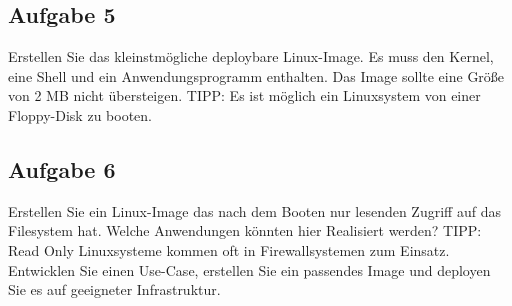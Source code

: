 \documentclass{article}
\begin{document}
    \subsection{Aufgabe 5}
    Erstellen Sie das kleinstmögliche deploybare Linux-Image. Es muss den Kernel, eine Shell und ein Anwendungsprogramm enthalten.
    Das Image sollte eine Größe von 2 MB nicht übersteigen. TIPP: Es ist möglich ein Linuxsystem von einer Floppy-Disk zu booten.
    
    \subsection{Aufgabe 6}
    Erstellen Sie ein Linux-Image das nach dem Booten nur lesenden Zugriff auf das Filesystem hat.
    Welche Anwendungen könnten hier Realisiert werden? TIPP: Read Only Linuxsysteme kommen oft in Firewallsystemen zum Einsatz.
    Entwicklen Sie einen Use-Case, erstellen Sie ein passendes Image und deployen Sie es auf geeigneter Infrastruktur.
\end{document}
